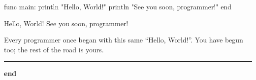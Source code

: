 \begin{salamcode}
func main:
    println "Hello, World!"
    println "See you soon, programmer!"
end
\end{salamcode}

\begin{salamout}
Hello, World!
See you soon, programmer!
\end{salamout}

Every programmer once began with this same ``Hello, World!''. You have begun
too; the rest of the road is yours.

\vspace{1.5em}
\begin{center}
{\color{brand}\rule{2.5cm}{1pt}}\par\vspace{0.6em}
{\salamcodefont\bfseries\Large\color{salamKeyword}end}
\end{center}
